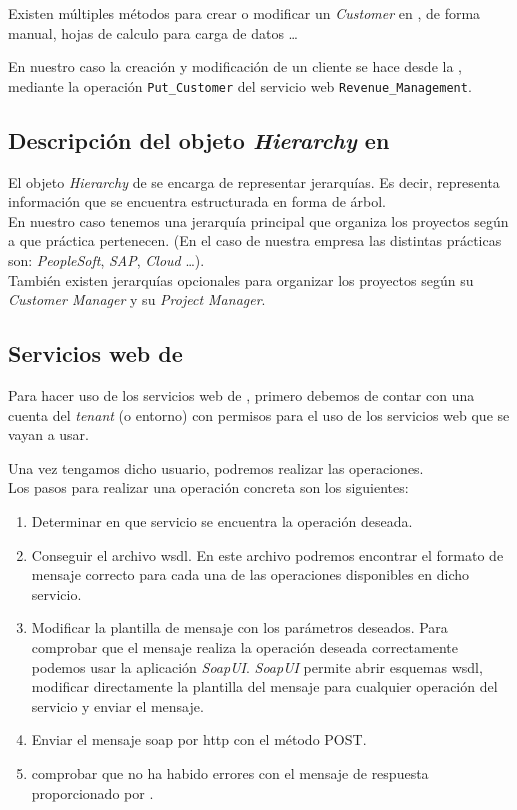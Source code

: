 Existen múltiples métodos para crear o modificar un \textit{Customer} en \wday{}, de forma manual, hojas de calculo para carga de datos \ldots

En nuestro caso la creación y modificación de un cliente se hace desde la \iface{}, 
mediante la operación \texttt{Put\_Customer} del servicio web \texttt{Revenue\_Management}.

\subsection{Descripción del objeto \textit{Hierarchy} en \wday{}}

El objeto \textit{Hierarchy} de \wday{} se encarga de representar jerarquías.
Es decir, representa información que se encuentra estructurada en forma de árbol.\\

En nuestro caso tenemos una jerarquía principal que organiza los proyectos según a que práctica pertenecen. 
(En el caso de nuestra empresa las distintas prácticas son: \textit{PeopleSoft}, \textit{SAP}, \textit{Cloud} \ldots).\\

También existen jerarquías opcionales para organizar los proyectos según su \textit{Customer Manager} y su \textit{Project Manager}.

\subsection{Servicios web de \wday{}}

Para hacer uso de los servicios web de \wday{}, primero debemos de contar con una cuenta del \textit{tenant} (o entorno) con permisos para el uso de los servicios web que se vayan a usar.

Una vez tengamos dicho usuario, podremos realizar las operaciones.\\

Los pasos para realizar una operación concreta son los siguientes:

\begin{enumerate}
	\item Determinar en que servicio se encuentra la operación deseada.
	\item Conseguir el archivo \acrshort{wsdl}. En este archivo podremos encontrar el formato de mensaje correcto para cada una de las operaciones disponibles en dicho servicio.
	\item Modificar la plantilla de mensaje con los parámetros deseados. 
	Para comprobar que el mensaje realiza la operación deseada correctamente podemos usar la aplicación \textit{SoapUI}. %
	\textit{SoapUI} permite abrir esquemas \acrshort{wsdl}, modificar directamente la plantilla del mensaje para cualquier operación del servicio y enviar el mensaje.
	\item Enviar el mensaje \acrshort{soap} por \acrshort{http} con el método POST.
	\item comprobar que no ha habido errores con el mensaje de respuesta proporcionado por \wday.
\end{enumerate}

